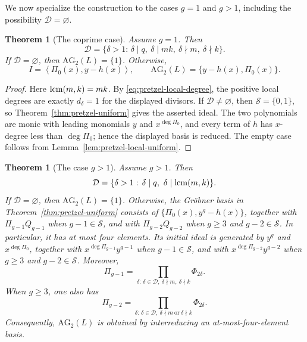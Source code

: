 \documentclass{article}
\theoremstyle{definition}
\theoremstyle{plain}
\newtheorem{theorem}[definition]{Theorem}
\newcommand{\lcm}{{\rm lcm}}
\newcommand{\ideal}[1]{\left\langle #1 \right\rangle}
\newcommand{\AG}{\mathrm{AG}}
\begin{document}
We now specialize the construction to the cases \(g=1\) and \(g>1\),
including the possibility \(\mathcal D=\varnothing\).

\begin{theorem}[The coprime case]\label{thm:pretzel-g1}
Assume \(g=1\).  Then
\[
\mathcal D=
\{\delta>1:\,\delta\mid q,\ \delta\mid mk,\
  \delta\nmid m,\ \delta\nmid k\}.
\]
If \(\mathcal D=\varnothing\), then \(\AG_2(L)=\{1\}\).  Otherwise,
\[
I=\ideal{\Pi_0(x),y-h(x)},
\qquad
\AG_2(L)=\{y-h(x),\Pi_0(x)\}.
\]
\end{theorem}

\begin{proof}
Here \(\lcm(m,k)=mk\).  By
\eqref{eq:pretzel-local-degree}, the positive local degrees are exactly
\(d_\delta=1\) for the displayed divisors.  If \(\mathcal D\ne\varnothing\),
then \(\mathcal S=\{0,1\}\), so
Theorem~\ref{thm:pretzel-uniform} gives the asserted ideal.  The two
polynomials are monic with leading monomials \(y\) and
\(x^{\deg\Pi_0}\), and every term of \(h\) has \(x\)-degree less than
\(\deg\Pi_0\); hence the displayed basis is reduced.  The empty case
follows from
Lemma~\ref{lem:pretzel-local-uniform}.
\end{proof}

\begin{theorem}[The case \(g>1\)]\label{thm:pretzel-gt1}
Assume \(g>1\).  Then
\[
\mathcal D=
\{\delta>1:\,\delta\mid q,\ \delta\mid\lcm(m,k)\}.
\]
If \(\mathcal D=\varnothing\), then \(\AG_2(L)=\{1\}\).  Otherwise, the
Gr\"obner basis in Theorem~\ref{thm:pretzel-uniform} consists of
\(\{\Pi_0(x),y^g-h(x)\}\), together with \(\Pi_{g-1}Q_{g-1}\) when
\(g-1\in\mathcal S\), and with \(\Pi_{g-2}Q_{g-2}\) when
\(g\ge3\) and \(g-2\in\mathcal S\).  In particular, it has at most four
elements.  Its initial ideal is generated by \(y^g\) and
\(x^{\deg\Pi_0}\), together with \(x^{\deg\Pi_{g-1}}y^{g-1}\) when
\(g-1\in\mathcal S\), and with
\(x^{\deg\Pi_{g-2}}y^{g-2}\) when
\(g\ge3\) and \(g-2\in\mathcal S\).  Moreover,
\[
\Pi_{g-1}=
\prod_{\delta:\,\delta\in\mathcal D,\ \delta\nmid m,\ \delta\nmid k}\Phi_{2\delta}.
\]
When \(g\ge3\), one also has
\[
\Pi_{g-2}=
\prod_{\delta:\,\delta\in\mathcal D,\ \delta\nmid m\ \text{or}\ \delta\nmid k}\Phi_{2\delta}.
\]
Consequently, \(\AG_2(L)\) is obtained by interreducing an
at-most-four-element basis.
\end{theorem}
\end{document}
